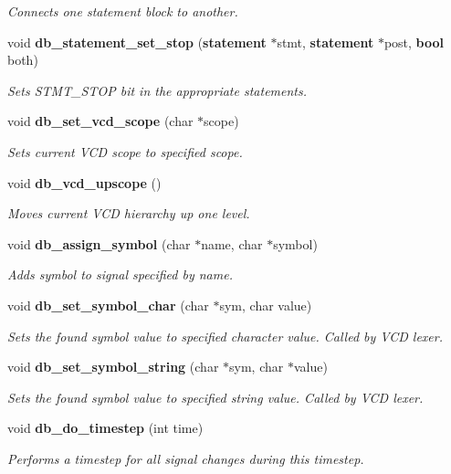 \begin{CompactItemize}
\begin{CompactList}\small\item\em Connects one statement block to another.\item\end{CompactList}\item 
void {\bf db\_\-statement\_\-set\_\-stop} ({\bf statement} $\ast$stmt, {\bf statement} $\ast$post, {\bf bool} both)
\begin{CompactList}\small\item\em Sets STMT\_\-STOP bit in the appropriate statements.\item\end{CompactList}\item 
void {\bf db\_\-set\_\-vcd\_\-scope} (char $\ast$scope)
\begin{CompactList}\small\item\em Sets current VCD scope to specified scope.\item\end{CompactList}\item 
void {\bf db\_\-vcd\_\-upscope} ()
\begin{CompactList}\small\item\em Moves current VCD hierarchy up one level.\item\end{CompactList}\item 
void {\bf db\_\-assign\_\-symbol} (char $\ast$name, char $\ast$symbol)
\begin{CompactList}\small\item\em Adds symbol to signal specified by name.\item\end{CompactList}\item 
void {\bf db\_\-set\_\-symbol\_\-char} (char $\ast$sym, char value)
\begin{CompactList}\small\item\em Sets the found symbol value to specified character value. Called by VCD lexer.\item\end{CompactList}\item 
void {\bf db\_\-set\_\-symbol\_\-string} (char $\ast$sym, char $\ast$value)
\begin{CompactList}\small\item\em Sets the found symbol value to specified string value. Called by VCD lexer.\item\end{CompactList}\item 
void {\bf db\_\-do\_\-timestep} (int time)
\begin{CompactList}\small\item\em Performs a timestep for all signal changes during this timestep.\item\end{CompactList}\end{CompactItemize}
